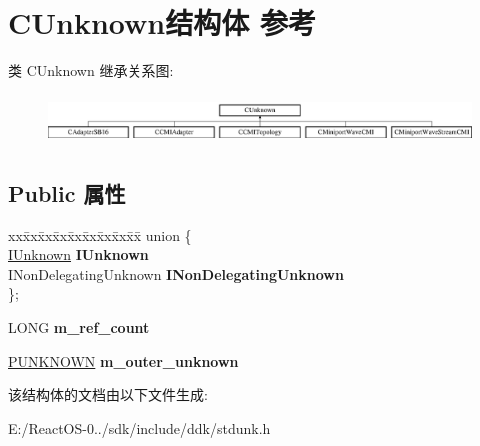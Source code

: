 \hypertarget{struct_c_unknown}{}\section{C\+Unknown结构体 参考}
\label{struct_c_unknown}
类 C\+Unknown 继承关系图\+:\begin{figure}[H]
\begin{center}
\leavevmode
\includegraphics[height=1.325444cm]{struct_c_unknown}
\end{center}
\end{figure}
\subsection*{Public 属性}
\begin{DoxyCompactItemize}
\item 
\mbox{\label{struct_c_unknown_addbfd36dbf823bb0e65c9252728e97fe}} 
\begin{tabbing}
xx\=xx\=xx\=xx\=xx\=xx\=xx\=xx\=xx\=\kill
union \{\\
\>\hyperlink{interface_i_unknown}{IUnknown} {\bfseries IUnknown}\\
\>INonDelegatingUnknown {\bfseries INonDelegatingUnknown}\\
\}; \\

\end{tabbing}\item 
\mbox{\label{struct_c_unknown_a63fc55d2b9ef8b22f6acfe93a27971bb}} 
L\+O\+NG {\bfseries m\+\_\+ref\+\_\+count}
\item 
\mbox{\label{struct_c_unknown_a2eccc6bde142dafbd553b8eec21ccf72}} 
\hyperlink{interface_i_unknown}{P\+U\+N\+K\+N\+O\+WN} {\bfseries m\+\_\+outer\+\_\+unknown}
\end{DoxyCompactItemize}


该结构体的文档由以下文件生成\+:\begin{DoxyCompactItemize}
\item 
E\+:/\+React\+O\+S-\/0../sdk/include/ddk/stdunk.\+h\end{DoxyCompactItemize}
